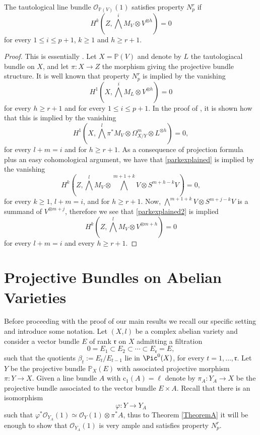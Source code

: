 \documentclass[11pt,letter]{amsart}
\numberwithin{equation}{section}
\begin{document}
\begin{prop}\label{PARK}
    The tautological line bundle $\mathcal{O}_{\mathbb{P}(V)}(1)$ satisfies property $N_p^r$
 if 
 \[H^k\left(Z,\bigwedge^i M_V\otimes V^{\otimes h}\right)=0\]
 for every $1\leq i\leq p+1 $, $k\geq 1$ and $h\geq r+1.$
 \end{prop}
 \begin{proof}
     This is essentially \cite[Prop. 3.2]{Park}. Let $X=\mathbb{P}(V)$ and denote by $L$ the tautologiacal bundle on $X$, and let $\pi:X\rightarrow Z$ the morphism giving the projective bundle structure. It is well known that property $N_p^r$ is implied by the vanishing 
      \[H^1\left(X,\bigwedge^i M_L\otimes V^{\otimes h}\right)=0\]
      for every $h\geq r+1$ and for every $1\leq i\leq p+1$. In the proof of \cite[Prop. 3.2]{Park}, it is shown how that this is implied by the vanishing
     \begin{equation}\label{parkexplained}H^1\left(X,\bigwedge^l\pi^*M_V\otimes\Omega^m_{X/Y}\otimes L^{\otimes h}\right)=0,
     \end{equation}
      for every $l+m=i$ and for $h\geq r+1$.
      As a consequence of projection formula plus an easy cohomological argument, we have that \eqref{parkexplained}  is implied  by the vanishing 
      \begin{equation}\label{parkexplained2}
H^k\left(Z,\bigwedge^lM_V\otimes\bigwedge^{m+1+k}V\otimes S^{m+h-k} V\right)=0,
      \end{equation}
       for every $k\geq 1$, $l+m=i$, and for $h\geq r+1$. Now, 
      $\bigwedge^{m+1+k}V\otimes S^{m+j-k}V$ is a summand of $V^{\otimes m+j}$, therefore we see that \eqref{parkexplained2}
 is implied      \[H^k\left(Z,\bigwedge^lM_V\otimes V^{\otimes m+h}\right)=0\]
      for every $l+m=i$ and every $h\geq r+1$.
       
       
 \end{proof}
\section{Projective Bundles on Abelian Varieties}\label{sec4}
Before proceeding with the proof of our main results we recall our specific setting and introduce some notation. Let $(X,l)$ be a complex abelian variety and consider a vector bundle $E$ of rank $\mathfrak{r}$ on $X$ admitting a filtration
\begin{equation}\label{eq:filtration}
    0=E_1\subset E_2\subset\cdots\subset E_\mathfrak{r}=E,
\end{equation}
such that the quotients
$\beta_t:=E_t/E_{t-1}$ lie in $\Pic^0(X)$, for every $t=1,\ldots,\mathfrak{r}$.
Let $Y$ be the projective bundle $\mathbb{P}_X(E)$ with associated projective morphism $\pi:Y\rightarrow X$. Given a line bundle $A$ with $\mathrm{c}_1(A)=\ell$ denote by $\pi_A:Y_A\rightarrow X$ be the projective bundle associated to the vector bundle $E\times A$. Recall that there is an isomorphism 
\[\varphi:Y \rightarrow Y_A\]
such that $\varphi^*\mathcal{O}_{Y_A}(1)\simeq \mathcal{O}_{Y}(1)\otimes \pi^*A$, thus to Theorem \ref{TheoremA} it will be enough to show that $\mathcal{O}_{Y_A}(1)$ is very ample and satisfies property $N_p^r$. 
\end{document}
